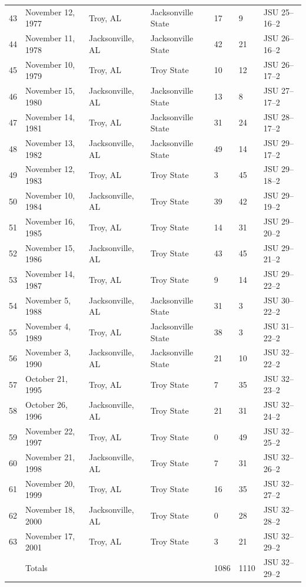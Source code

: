 \documentclass{article}
\begin{document}
\begin{tabular}{lllllll}
43 & November 12, 1977 & Troy, AL & Jacksonville State & 17 & 9 & JSU 25–16–2 \\
44 & November 11, 1978 & Jacksonville, AL & Jacksonville State & 42 & 21 & JSU 26–16–2 \\
45 & November 10, 1979 & Troy, AL & Troy State & 10 & 12 & JSU 26–17–2 \\
46 & November 15, 1980 & Jacksonville, AL & Jacksonville State & 13 & 8 & JSU 27–17–2 \\
47 & November 14, 1981 & Troy, AL & Jacksonville State & 31 & 24 & JSU 28–17–2 \\
48 & November 13, 1982 & Jacksonville, AL & Jacksonville State & 49 & 14 & JSU 29–17–2 \\
49 & November 12, 1983 & Troy, AL & Troy State & 3 & 45 & JSU 29–18–2 \\
50 & November 10, 1984 & Jacksonville, AL & Troy State & 39 & 42 & JSU 29–19–2 \\
51 & November 16, 1985 & Troy, AL & Troy State & 14 & 31 & JSU 29–20–2 \\
52 & November 15, 1986 & Jacksonville, AL & Troy State & 43 & 45 & JSU 29–21–2 \\
53 & November 14, 1987 & Troy, AL & Troy State & 9 & 14 & JSU 29–22–2 \\
54 & November 5, 1988 & Jacksonville, AL & Jacksonville State & 31 & 3 & JSU 30–22–2 \\
55 & November 4, 1989 & Troy, AL & Jacksonville State & 38 & 3 & JSU 31–22–2 \\
56 & November 3, 1990 & Jacksonville, AL & Jacksonville State & 21 & 10 & JSU 32–22–2 \\
57 & October 21, 1995 & Troy, AL & Troy State & 7 & 35 & JSU 32–23–2 \\
58 & October 26, 1996 & Jacksonville, AL & Troy State & 21 & 31 & JSU 32–24–2 \\
59 & November 22, 1997 & Troy, AL & Troy State & 0 & 49 & JSU 32–25–2 \\
60 & November 21, 1998 & Jacksonville, AL & Troy State & 7 & 31 & JSU 32–26–2 \\
61 & November 20, 1999 & Troy, AL & Troy State & 16 & 35 & JSU 32–27–2 \\
62 & November 18, 2000 & Jacksonville, AL & Troy State & 0 & 28 & JSU 32–28–2 \\
63 & November 17, 2001 & Troy, AL & Troy State & 3 & 21 & JSU 32–29–2 \\
 & Totals &  &  & 1086 & 1110 & JSU 32–29–2 \\
\bottomrule
\end{tabular}
\end{document}
